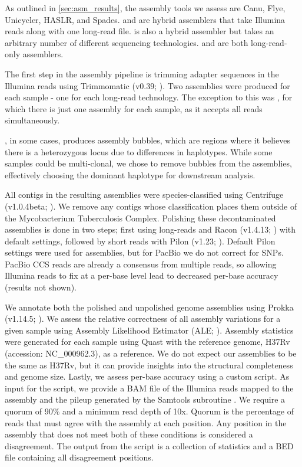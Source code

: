 As outlined in \autoref{sec:asm_results}, the assembly tools we assess are Canu, Flye, Unicycler, HASLR, and Spades. \haslr{} and \unicycler{} are hybrid assemblers that take Illumina reads along with one long-read file. \spades{} is also a hybrid assembler but takes an arbitrary number of different sequencing technologies. \canu{} and \flye{} are both long-read-only assemblers.

The first step in the assembly pipeline is trimming adapter sequences in the Illumina reads using Trimmomatic (v0.39; \cite{bolger2014}). Two assemblies were produced for each sample - one for each long-read technology. The exception to this was \spades{}, for which there is just one assembly for each sample, as it accepts all reads simultaneously. 

\canu{}, in some cases, produces assembly bubbles, which are regions where it believes there is a heterozygous locus due to differences in haplotypes. While some samples could be multi-clonal, we chose to remove bubbles from the \canu{} assemblies, effectively choosing the dominant haplotype for downstream analysis.  

All contigs in the resulting assemblies were species-classified using Centrifuge (v1.0.4beta; \cite{kim2016}). We remove any contigs whose classification places them outside of the Mycobacterium Tuberculosis Complex. Polishing these decontaminated assemblies is done in two steps; first using long-reads and Racon (v1.4.13; \cite{vaser2017}) with default settings, followed by short reads with Pilon (v1.23; \cite{pilon2014}). Default Pilon settings were used for \ont{} assemblies, but for PacBio we do not correct for SNPs. PacBio CCS reads are already a consensus from multiple reads, so allowing Illumina reads to fix at a per-base level lead to decreased per-base accuracy (results not shown).  

We annotate both the polished and unpolished genome assemblies using Prokka (v1.14.5; \cite{seeman2014}). We assess the relative correctness of all assembly variations for a given sample using Assembly Likelihood Estimator (ALE; \cite{clark2013}). Assembly statistics were generated for each sample using Quast \cite{quast2013} with the \mtb{} reference genome, H37Rv (accession: NC\_000962.3), as a reference. We do not expect our assemblies to be the same as H37Rv, but it can provide insights into the structural completeness and genome size. Lastly, we assess per-base accuracy using a custom script. As input for the script, we provide a BAM file of the Illumina reads mapped to the assembly and the pileup generated by the Samtools subroutine  \cite{samtools2009}. We require a quorum of 90\% and a minimum read depth of 10x. Quorum is the percentage of reads that must agree with the assembly at each position. Any position in the assembly that does not meet both of these conditions is considered a disagreement. The output from the script is a collection of statistics and a BED file containing all disagreement positions.


